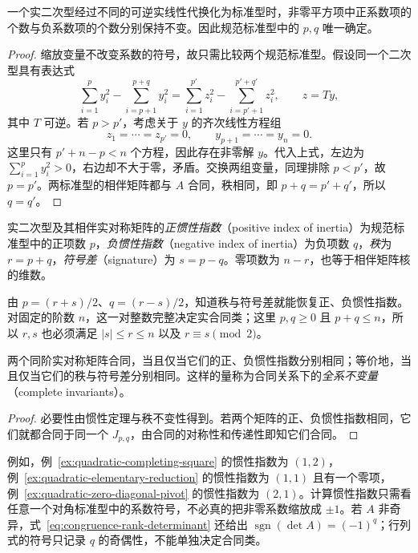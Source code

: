 \begin{theorem}[惯性定理]
\label{thm:real-quadratic-inertia}
一个实二次型经过不同的可逆实线性代换化为标准型时，非零平方项中正系数项的个数与负系数项的个数分别保持不变。因此规范标准型中的 $p,q$ 唯一确定。
\end{theorem}
\begin{proof}
缩放变量不改变系数的符号，故只需比较两个规范标准型。假设同一个二次型具有表达式
\[
    \sum_{i=1}^p y_i^2-\sum_{i=p+1}^{p+q}y_i^2
    =\sum_{i=1}^{p'}z_i^2-\sum_{i=p'+1}^{p'+q'}z_i^2,
    \qquad z=Ty,
\]
其中 $T$ 可逆。若 $p>p'$，考虑关于 $y$ 的齐次线性方程组
\[
    z_1=\cdots=z_{p'}=0,
    \qquad y_{p+1}=\cdots=y_n=0.
\]
这里只有 $p'+n-p<n$ 个方程，因此存在非零解 $y$。代入上式，左边为 $\sum_{i=1}^p y_i^2>0$，右边却不大于零，矛盾。交换两组变量，同理排除 $p<p'$，故 $p=p'$。两标准型的相伴矩阵都与 $A$ 合同，秩相同，即 $p+q=p'+q'$，所以 $q=q'$。
\end{proof}

\begin{definition}
\label{def:quadratic-inertia-indices}
实二次型及其相伴实对称矩阵的\emph{正惯性指数}（positive index of inertia）为规范标准型中的正项数 $p$，\emph{负惯性指数}（negative index of inertia）为负项数 $q$，\emph{秩}为 $r=p+q$，\emph{符号差}（signature）为 $s=p-q$。零项数为 $n-r$，也等于相伴矩阵核的维数。
\end{definition}

由 $p=(r+s)/2$、$q=(r-s)/2$，知道秩与符号差就能恢复正、负惯性指数。对固定的阶数 $n$，这一对整数完整决定实合同类；这里 $p,q\geq0$ 且 $p+q\leq n$，所以 $r,s$ 也必须满足 $|s|\leq r\leq n$ 以及 $r\equiv s\pmod2$。

\begin{theorem}
\label{thm:real-symmetric-congruence-classification}
两个同阶实对称矩阵合同，当且仅当它们的正、负惯性指数分别相同；等价地，当且仅当它们的秩与符号差分别相同。这样的量称为合同关系下的\emph{全系不变量}（complete invariants）。
\end{theorem}
\begin{proof}
必要性由惯性定理与秩不变性得到。若两个矩阵的正、负惯性指数相同，它们就都合同于同一个 $J_{p,q}$，由合同的对称性和传递性即知它们合同。
\end{proof}

例如，例~\ref{ex:quadratic-completing-square} 的惯性指数为 $(1,2)$，例~\ref{ex:quadratic-elementary-reduction} 的惯性指数为 $(1,1)$ 且有一个零项，例~\ref{ex:quadratic-zero-diagonal-pivot} 的惯性指数为 $(2,1)$。计算惯性指数只需看任意一个对角标准型中的系数符号，不必真的把非零系数缩放成 $\pm1$。若 $A$ 非奇异，式~\eqref{eq:congruence-rank-determinant} 还给出 $\operatorname{sgn}(\det A)=(-1)^q$；行列式的符号只记录 $q$ 的奇偶性，不能单独决定合同类。

